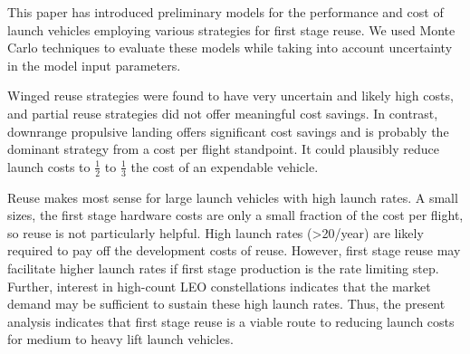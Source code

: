 \documentclass[conf]{new-aiaa}
\begin{document}
\begin{multicols}{2}
This paper has introduced preliminary models for the performance and cost of launch vehicles employing various strategies for first stage reuse. We used Monte Carlo techniques to evaluate these models while taking into account uncertainty in the model input parameters.

Winged reuse strategies were found to have very uncertain and likely high costs, and partial reuse strategies did not offer meaningful cost savings. In contrast, downrange propulsive landing offers significant cost savings and is probably the dominant strategy from a cost per flight standpoint. It could plausibly reduce launch costs to $\frac{1}{2}$ to $\frac{1}{3}$ the cost of an expendable vehicle.

Reuse makes most sense for large launch vehicles with high launch rates. A small sizes, the first stage hardware costs are only a small fraction of the cost per flight, so reuse is not particularly helpful. High launch rates (>20/year) are likely required to pay off the development costs of reuse. However, first stage reuse may facilitate higher launch rates if first stage production is the rate limiting step. Further, interest in high-count LEO constellations indicates that the market demand may be sufficient to sustain these high launch rates. Thus, the present analysis indicates that first stage reuse is a viable route to reducing launch costs for medium to heavy lift launch vehicles.


\end{multicols}
\end{document}
